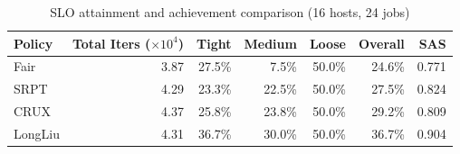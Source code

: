 \begin{table}[t]
\centering
\caption{SLO attainment and achievement comparison (16 hosts, 24 jobs)}
\label{tab:slo_16host}
\begin{tabular}{l|r|r|r|r|r|r}
\hline
Policy & Total Iters ($\times 10^4$) & Tight & Medium & Loose & Overall & SAS \\
\hline
Fair & 3.87 & 27.5\% & 7.5\% & 50.0\% & 24.6\% & 0.771 \\
SRPT & 4.29 & 23.3\% & 22.5\% & 50.0\% & 27.5\% & 0.824 \\
CRUX & 4.37 & 25.8\% & 23.8\% & 50.0\% & 29.2\% & 0.809 \\
LongLiu & 4.31 & 36.7\% & 30.0\% & 50.0\% & 36.7\% & 0.904 \\
\hline
\end{tabular}
\end{table}
